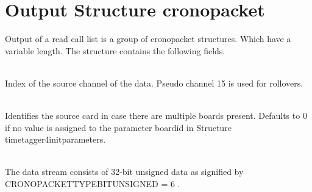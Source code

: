 


\section{Output Structure crono\tu packet}

    Output of a read call list is a group of crono\tu packet structures. Which have a variable length. The structure contains the following fields.
    
	\\
	Index of the source channel of the data. Pseudo channel 15 is used for rollovers.\par

	\\
	Identifies the source card in case there are multiple boards present. 
	Defaults to 0 if no value is assigned to the parameter \textsf{board\tu id} in Structure \textsf{timetagger4\tu init\tu parameters}.\par

	\\
	The data stream consists of 32-bit unsigned data as signified by \\ CRONO\tu PACKET\tu TYPE\tu BIT\tu UNSIGNED = 6 .\par


